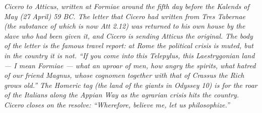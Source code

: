 
\textit{Cicero to Atticus, written at Formiae around the
fifth day before the Kalends of May (27 April) 59 BC. The
letter that Cicero had written from Tres Tabernae (the
substance of which is now Att 2.12) was returned to his own
house by the slave who had been given it, and Cicero is
sending Atticus the original. The body of the letter is
the famous travel report: at Rome the political crisis is
muted, but in the country it is not. ``If you come into
this Telepylus, this Laestrygonian land --- I mean Formiae
--- what an uproar of men, how angry the spirits, what
hatred of our friend Magnus, whose cognomen together with
that of Crassus the Rich grows old.'' The Homeric tag (the
land of the giants in \textit{Odyssey} 10) is for the
roar of the Italians along the Appian Way as the agrarian
crisis hits the country. Cicero closes on the resolve:
``Wherefore, believe me, let us philosophize.''}
